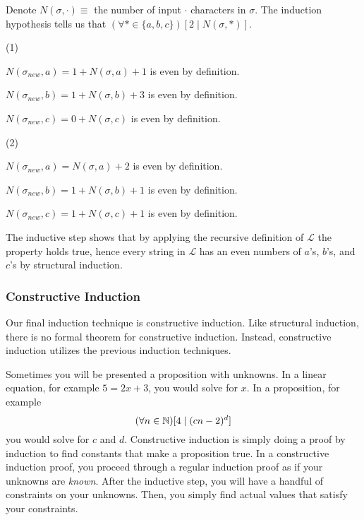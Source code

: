 \documentclass[main.tex]{subfiles}
\begin{document}
{	Denote \(N(\sigma, \cdot) \equiv\) the number of input \(\cdot\) characters in \(\sigma\). The induction hypothesis tells us that \((\forall * \in \{a,b,c\})[2 \mid N(\sigma, *)]\).
	
	(1)
	
	\(N(\sigma_{new}, a) = 1 + N(\sigma, a) + 1\) is even by definition.
	
	\(N(\sigma_{new}, b) = 1 + N(\sigma, b) + 3\) is even by definition.
	
	\(N(\sigma_{new}, c) = 0 + N(\sigma, c)\) is even by definition.
	
	(2)
	
	\(N(\sigma_{new}, a) = N(\sigma, a) + 2\) is even by definition.
	
	\(N(\sigma_{new}, b) = 1 + N(\sigma, b) + 1\) is even by definition.
	
	\(N(\sigma_{new}, c) = 1 + N(\sigma, c) + 1\) is even by definition.
	
	The inductive step shows that by applying the recursive definition of \(\mathcal{L}\) the property holds true, hence every string in \(\mathcal{L}\) has an even numbers of \(a\)'s, \(b\)'s, and \(c\)'s by structural induction.
}

\subsubsection{Constructive Induction}

Our final induction technique is constructive induction. Like structural induction, there is no formal theorem for constructive induction. Instead, constructive induction utilizes the previous induction techniques.

Sometimes you will be presented a proposition with unknowns. In a linear equation, for example \(5 = 2x + 3\), you would solve for \(x\). In a proposition, for example \[(\forall n \in \mathbb{N})[ 4 \mid (cn - 2)^d ]\] you would solve for \(c\) and \(d\). Constructive induction is simply doing a proof by induction to find constants that make a proposition true. In a constructive induction proof, you proceed through a regular induction proof as if your unknowns are \textit{known}. After the inductive step, you will have a handful of constraints on your unknowns. Then, you simply find actual values that satisfy your constraints.
\end{document}
